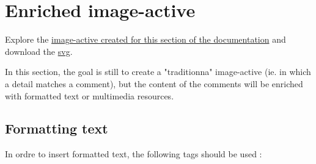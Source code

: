 {\section{Enriched image-active}

Explore the \href{http://geoffrey-gekiere.ac-versailles.fr/xia2}{image-active 
created for this section of the documentation} and download the 
\href{http://geoffrey-gekiere.ac-versailles.fr/xia2/svg/xia2.svg}{svg}.

In this section, the goal is still to create a "traditionna" image-active 
(ie. in which a detail matches a comment), but the content of the comments 
will be enriched with  formatted text or multimedia resources.

\subsection{Formatting text}

In ordre to insert formatted text, the following tags should be used :

}
